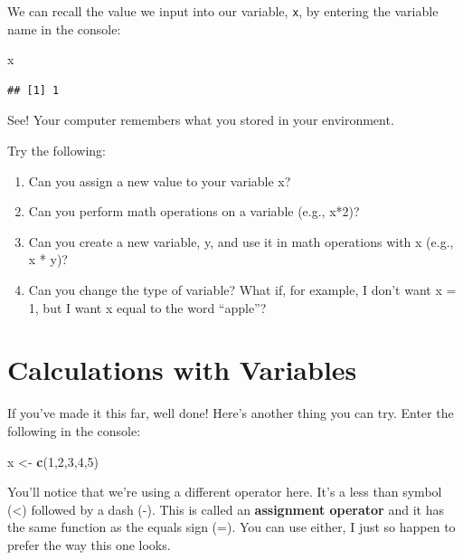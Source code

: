 \documentclass[
]{book}
\newenvironment{Shaded}{\begin{snugshade}}{\end{snugshade}}
\newcommand{\DecValTok}[1]{\textcolor[rgb]{0.00,0.00,0.81}{#1}}
\newcommand{\FunctionTok}[1]{\textcolor[rgb]{0.13,0.29,0.53}{\textbf{#1}}}
\newcommand{\NormalTok}[1]{#1}
\newcommand{\OtherTok}[1]{\textcolor[rgb]{0.56,0.35,0.01}{#1}}
\begin{document}
We can recall the value we input into our variable, \texttt{x}, by entering the variable name in the console:

\begin{Shaded}
\begin{Highlighting}[]
\NormalTok{x}
\end{Highlighting}
\end{Shaded}

\begin{verbatim}
## [1] 1
\end{verbatim}

See! Your computer remembers what you stored in your environment.

Try the following:

\begin{enumerate}
\def\labelenumi{\arabic{enumi}.}
\item
  Can you assign a new value to your variable x?
\item
  Can you perform math operations on a variable (e.g., x*2)?
\item
  Can you create a new variable, y, and use it in math operations with x (e.g., x * y)?
\item
  Can you change the type of variable? What if, for example, I don't want x = 1, but I want x equal to the word ``apple''?
\end{enumerate}

\hypertarget{calculations-with-variables}{%
\section{Calculations with Variables}\label{calculations-with-variables}}

If you've made it this far, well done! Here's another thing you can try. Enter the following in the console:

\begin{Shaded}
\begin{Highlighting}[]
\NormalTok{x }\OtherTok{\textless{}{-}} \FunctionTok{c}\NormalTok{(}\DecValTok{1}\NormalTok{,}\DecValTok{2}\NormalTok{,}\DecValTok{3}\NormalTok{,}\DecValTok{4}\NormalTok{,}\DecValTok{5}\NormalTok{)}
\end{Highlighting}
\end{Shaded}

You'll notice that we're using a different operator here. It's a less than symbol (\textless) followed by a dash (-). This is called an \textbf{assignment operator} and it has the same function as the equals sign (=). You can use either, I just so happen to prefer the way this one looks.
\end{document}
